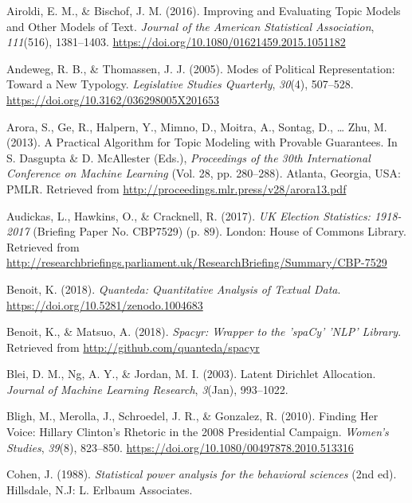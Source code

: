 \documentclass[]{article}
\begin{document}
\hypertarget{refs}{}
\leavevmode\hypertarget{ref-airoldi2016}{}%
Airoldi, E. M., \& Bischof, J. M. (2016). Improving and Evaluating Topic
Models and Other Models of Text. \emph{Journal of the American
Statistical Association}, \emph{111}(516), 1381--1403.
\url{https://doi.org/10.1080/01621459.2015.1051182}

\leavevmode\hypertarget{ref-andeweg2005}{}%
Andeweg, R. B., \& Thomassen, J. J. (2005). Modes of Political
Representation: Toward a New Typology. \emph{Legislative Studies
Quarterly}, \emph{30}(4), 507--528.
\url{https://doi.org/10.3162/036298005X201653}

\leavevmode\hypertarget{ref-arora2013}{}%
Arora, S., Ge, R., Halpern, Y., Mimno, D., Moitra, A., Sontag, D.,
\ldots{} Zhu, M. (2013). A Practical Algorithm for Topic Modeling with
Provable Guarantees. In S. Dasgupta \& D. McAllester (Eds.),
\emph{Proceedings of the 30th International Conference on Machine
Learning} (Vol. 28, pp. 280--288). Atlanta, Georgia, USA: PMLR.
Retrieved from \url{http://proceedings.mlr.press/v28/arora13.pdf}

\leavevmode\hypertarget{ref-audickas2017}{}%
Audickas, L., Hawkins, O., \& Cracknell, R. (2017). \emph{UK Election
Statistics: 1918-2017} (Briefing Paper No. CBP7529) (p. 89). London:
House of Commons Library. Retrieved from
\url{http://researchbriefings.parliament.uk/ResearchBriefing/Summary/CBP-7529}

\leavevmode\hypertarget{ref-benoit2018}{}%
Benoit, K. (2018). \emph{Quanteda: Quantitative Analysis of Textual
Data}. \url{https://doi.org/10.5281/zenodo.1004683}

\leavevmode\hypertarget{ref-benoit2018a}{}%
Benoit, K., \& Matsuo, A. (2018). \emph{Spacyr: Wrapper to the 'spaCy'
'NLP' Library}. Retrieved from \url{http://github.com/quanteda/spacyr}

\leavevmode\hypertarget{ref-blei2003}{}%
Blei, D. M., Ng, A. Y., \& Jordan, M. I. (2003). Latent Dirichlet
Allocation. \emph{Journal of Machine Learning Research}, \emph{3}(Jan),
993--1022.

\leavevmode\hypertarget{ref-bligh2010}{}%
Bligh, M., Merolla, J., Schroedel, J. R., \& Gonzalez, R. (2010).
Finding Her Voice: Hillary Clinton's Rhetoric in the 2008 Presidential
Campaign. \emph{Women's Studies}, \emph{39}(8), 823--850.
\url{https://doi.org/10.1080/00497878.2010.513316}

\leavevmode\hypertarget{ref-cohen1988}{}%
Cohen, J. (1988). \emph{Statistical power analysis for the behavioral
sciences} (2nd ed). Hillsdale, N.J: L. Erlbaum Associates.
\end{document}

